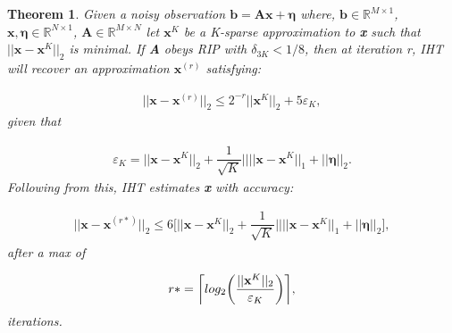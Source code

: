 \documentclass[titlepage,oneside, 12pt]{book}
\DeclarePairedDelimiter{\ceil}{\lceil}{\rceil}
\theoremstyle{break}
\begin{document}
\newtheorem*{IHT}{Theorem}
\begin{IHT}
Given a noisy observation $ \textbf{b} = \textbf{Ax} + \pmb{\eta}$ where, $\textbf{b} \in \mathbb{R}^{M \times 1}$, $\textbf{x},\pmb{\eta} \in \mathbb{R}^{N \times 1}$, $\textbf{A} \in \mathbb{R}^{M \times N}$ let $\textbf{x}^{K}$ be a K-sparse approximation to \textbf{x} such that $||\textbf{x} - \textbf{x}^{K}||_{2}$ is minimal. If \textbf{A} obeys RIP with $\delta_{3K} < 1/8$, then at iteration r, IHT will recover an approximation $\textbf{x}^{(r)}$ satisfying:

\begin{equation}
\begin{gathered}
||\textbf{x} - \textbf{x}^{(r)}||_{2} \leq 2^{-r}||\textbf{x}^{K}||_{2} + 5\varepsilon_{K}, 
\end{gathered}
\end{equation}\bigskip
given that

\begin{equation}
\begin{gathered}
\varepsilon_{K} = ||\textbf{x} - \textbf{x}^{K}||_{2} + \dfrac{1}{\sqrt{K}}||||\textbf{x} - \textbf{x}^{K}||_{1} + ||\pmb{\eta}||_{2}.
\end{gathered}
\end{equation}\bigskip
Following from this, IHT estimates \textbf{x} with accuracy:

\begin{equation}
\begin{gathered}
||\textbf{x} - \textbf{x}^{(r*)}||_{2} \leq 6 \bigg[ ||\textbf{x} - \textbf{x}^{K}||_{2} + \dfrac{1}{\sqrt{K}}||||\textbf{x} - \textbf{x}^{K}||_{1} + ||\pmb{\eta}||_{2}\bigg],
\end{gathered}
\end{equation}
after a max of

\begin{equation}
\begin{gathered}
r* = \ceil[\bigg]{log_{2}\bigg(\dfrac{||\textbf{x}^{K}||_{2}}{\varepsilon_{K}}\bigg)},
\end{gathered}
\end{equation}\bigskip
iterations. 

\end{IHT}
\end{document}
